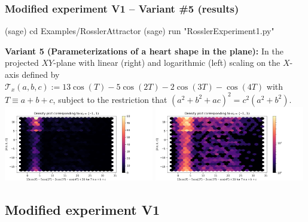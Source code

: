 \documentclass[usenames,svgnames,dvipsnames,10pt]{beamer}
\begin{document}
\begin{frame}[fragile]
\frametitle{Modified experiment V1 -- Variant \#5 (results)}

\begin{center}
\begin{code}
(sage) cd Examples/RosslerAttractor
(sage) run "RosslerExperiment1.py"
\end{code}
\textbf{Variant 5 (Parameterizations of a heart shape in the plane):} 
In the projected $XY$-plane with linear (right) and logarithmic (left) scaling on the $X$-axis defined by 
$\mathcal{T}_x(a, b, c) :=13\cos(T)-5\cos(2T)-2\cos(3T)-\cos(4T)$ with $T \equiv a + b + c$, 
subject to the restriction that $(a^2+b^2+ac)^2 = c^2(a^2+b^2)$. \\ 
\includegraphics[width=0.49\textwidth]{../Images/RosslerAttractorExpt1-Variant265242-linearscale-TypeXY-2021-10-27-095559.png}
\includegraphics[width=0.49\textwidth]{../Images/RosslerAttractorExpt1-Variant265242-logscale-TypeXY-2021-10-27-095541.png}
\end{center}

\end{frame}

\subsection{Modified experiment V1}
\end{document}
